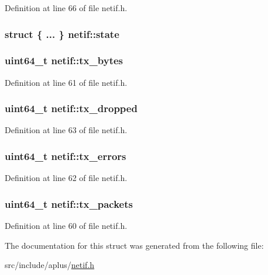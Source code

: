 Definition at line 66 of file netif.\+h.

\hypertarget{structnetif_a5ae2198374cbfd44de7e41e646aaae64}{
\subsubsection[{state}]{\setlength{\rightskip}{0pt plus 5cm}struct \{ ... \}   netif\+::state}}\label{structnetif_a5ae2198374cbfd44de7e41e646aaae64}
\hypertarget{structnetif_ac340647ad948b8103aa9a4e3c7b3fd0f}{
\subsubsection[{tx\+\_\+bytes}]{\setlength{\rightskip}{0pt plus 5cm}uint64\+\_\+t netif\+::tx\+\_\+bytes}}\label{structnetif_ac340647ad948b8103aa9a4e3c7b3fd0f}


Definition at line 61 of file netif.\+h.

\hypertarget{structnetif_a7793287254eb992df0174122a81654d0}{
\subsubsection[{tx\+\_\+dropped}]{\setlength{\rightskip}{0pt plus 5cm}uint64\+\_\+t netif\+::tx\+\_\+dropped}}\label{structnetif_a7793287254eb992df0174122a81654d0}


Definition at line 63 of file netif.\+h.

\hypertarget{structnetif_adac4c9e26ac4c17089eaf3a0e060f601}{
\subsubsection[{tx\+\_\+errors}]{\setlength{\rightskip}{0pt plus 5cm}uint64\+\_\+t netif\+::tx\+\_\+errors}}\label{structnetif_adac4c9e26ac4c17089eaf3a0e060f601}


Definition at line 62 of file netif.\+h.

\hypertarget{structnetif_aabafd7c28253a190863f673bd5e4320a}{
\subsubsection[{tx\+\_\+packets}]{\setlength{\rightskip}{0pt plus 5cm}uint64\+\_\+t netif\+::tx\+\_\+packets}}\label{structnetif_aabafd7c28253a190863f673bd5e4320a}


Definition at line 60 of file netif.\+h.



The documentation for this struct was generated from the following file\+:\begin{DoxyCompactItemize}
\item 
src/include/aplus/\hyperlink{netif_8h}{netif.\+h}\end{DoxyCompactItemize}
